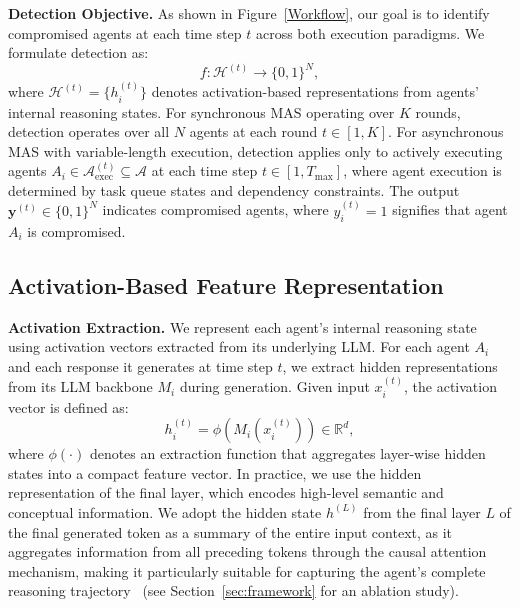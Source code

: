 \documentclass{article}
\theoremstyle{plain}
\theoremstyle{definition}
\theoremstyle{remark}
\begin{document}
\noindent\textbf{Detection Objective.}
As shown in Figure~\ref{Workflow}, our goal is to identify compromised agents at each time step $t$ across both 
execution paradigms. We formulate detection as:
\begin{equation}
f: \mathcal{H}^{(t)} \rightarrow \{0,1\}^N,
\end{equation}
where $\mathcal{H}^{(t)} = \{h_i^{(t)}\}$ denotes activation-based 
representations from agents' internal reasoning states.
For synchronous MAS operating over $K$ rounds, detection operates over all 
$N$ agents at each round $t \in [1, K]$. For asynchronous MAS with 
variable-length execution, detection applies only to actively executing agents 
$A_i \in \mathcal{A}_{\text{exec}}^{(t)} \subseteq \mathcal{A}$ at each 
time step $t \in [1, T_{\max}]$, where agent execution is determined by 
task queue states and dependency constraints.
The output $\mathbf{y}^{(t)} \in \{0,1\}^N$ indicates compromised agents, 
where $y_i^{(t)} = 1$ signifies that agent $A_i$ is compromised.



\subsection{Activation-Based Feature Representation}

\noindent\textbf{Activation Extraction.}
We represent each agent's internal reasoning state using activation vectors 
extracted from its underlying LLM.
For each agent $A_i$ and each response it generates at time step $t$, we
extract hidden representations from its LLM backbone $M_i$ during generation.
Given input $x_i^{(t)}$, the activation vector is defined as:
\begin{equation}
h_i^{(t)} = \phi\!\left(M_i(x_i^{(t)})\right) \in \mathbb{R}^d,
\end{equation}
where $\phi(\cdot)$ denotes an extraction function that aggregates layer-wise
hidden states into a compact feature vector.
In practice, we use the hidden representation of the final layer,
which encodes high-level semantic and conceptual information.
We adopt the hidden state $h^{(L)}$ from the final layer $L$ of the final generated token as a summary of the 
entire input context, as it aggregates information from all preceding tokens 
through the causal attention mechanism, making it particularly suitable for 
capturing the agent's complete reasoning trajectory~\cite{abdelnabi2025get,xu2024uncovering,zhang2025jbshield,tan2024revprag} (see Section~\ref{sec:framework} for an ablation study).
\end{document}
